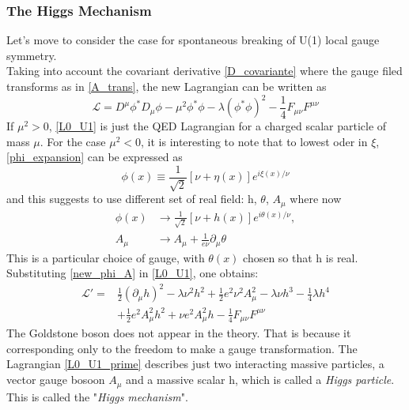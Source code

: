 \subsubsection{The Higgs Mechanism}%
Let's move to consider the case for spontaneous breaking of U(1) local gauge symmetry.\\
Taking into account the covariant derivative \ref{D_covariante} where the gauge filed transforms as in \ref{A_trans}, the new Lagrangian can be written as
\begin{equation}
\mathcal{L} = D^{\mu}\phi^{*}D_{\mu}\phi -\mu^{2}\phi^{*}\phi-\lambda(\phi^{*}\phi)^{2}-\frac{1}{4}F_{\mu\nu}F^{\mu\nu}
\label{L0_U1}
\end{equation}
If $\mu^{2} > 0$, \ref{L0_U1} is just the QED Lagrangian for a charged scalar particle of mass $\mu$.
For the case $\mu^{2} < 0$, it is interesting to note that to lowest oder in $\xi$, \ref{phi_expansion} can be expressed as
\begin{equation}
\phi(x) \equiv \frac{1}{\sqrt{2}}[\nu+\eta(x)]e^{i\xi(x)/\nu}
\label{phi_expansion_2}
\end{equation}
and this suggests to use different set of real field: h, $\theta$, $A_{\mu}$ where now
\begin{equation}
\begin{split}
\phi(x) &\to \frac{1}{\sqrt{2}}[\nu+h(x)]e^{i\theta(x)/\nu}, \\
A_{\mu} &\to A_{\mu}+ \frac{1}{e\nu}\partial_{\mu}\theta
\end{split}
\label{new_phi_A}
\end{equation}
This is a particular choice of gauge, with $\theta(x)$ chosen so that h is real. Substituting \ref{new_phi_A} in \ref{L0_U1}, one obtains:
\begin{equation}
\begin{split}
\mathcal{L}' = &\frac{1}{2}(\partial_{\mu}h)^{2}-\lambda\nu^{2}h^{2}+\frac{1}{2}e^{2}\nu^{2}A_{\mu}^{2}-\lambda\nu h^{3}-\frac{1}{4}\lambda h^{4}\\
&+\frac{1}{2}e^{2}A_{\mu}^{2}h^{2}+\nu e^{2}A_{\mu}^{2}h-\frac{1}{4}F_{\mu\nu}F^{\mu\nu}
\end{split}
\label{L0_U1_prime}
\end{equation}
The Goldstone boson does not appear in the theory. That is because it corresponding only to the freedom to make a gauge transformation. The Lagrangian \ref{L0_U1_prime} describes just two interacting massive particles, a vector gauge bosoon $A_{\mu}$ and a massive scalar h, which is called a \textit{Higgs particle}. This is called the "\textit{Higgs mechanism}".\\
